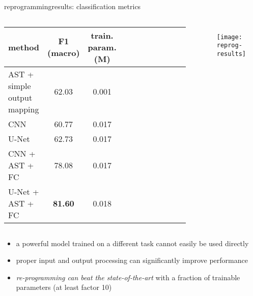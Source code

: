 \begin{frame}{reprogramming}{results: classification metrics}
    \begin{columns}
    \begin{footnotesize}
    \begin{table}[]
        \centering
        \begin{tabular}{l | c | c c c c c c c c c}
           method & F1 (macro) & train. param. (M) \\
           \hline
            AST + simple output mapping & 62.03 & 0.001\\
            CNN & 60.77 & 0.017\\
            U-Net & 62.73 & 0.017\\
            CNN + AST + FC & 78.08 & 0.017\\
            U-Net + AST + FC & \textbf{81.60} & 0.018
           
        \end{tabular}
    \end{table}
    \end{footnotesize}
    \begin{figure}%
    \texttt{[image: reprog-results]}%
    \end{figure}
    \end{columns}
    
    \begin{itemize}
        \item   a powerful model trained on a different task cannot easily be used directly
        \item   proper input and output processing can significantly improve performance
        \item   \textit{re-programming can beat the state-of-the-art} with a fraction of trainable parameters (at least factor 10)
    \end{itemize}
\end{frame}

